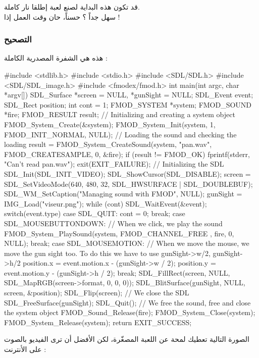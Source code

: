قد تكون هذه البداية لصنع لعبة إطلقا نار كاملة.\\
سهل جداً ؟ حسناً، حان وقت العمل إذا !

\subsubsection{التصحيح}

هذه هي الشفرة المصدرية الكاملة :

\begin{Csource}
#include <stdlib.h>
#include <stdio.h>
#include <SDL/SDL.h>
#include <SDL/SDL_image.h>
#include <fmodex/fmod.h>
int main(int argc, char *argv[])
{
	SDL_Surface *screen = NULL, *gunSight = NULL;
	SDL_Event event;
	SDL_Rect position;
	int cont = 1;
	FMOD_SYSTEM *system;
	FMOD_SOUND *fire;
	FMOD_RESULT result;
	// Initializing and creating a system object
	FMOD_System_Create(&system);
	FMOD_System_Init(system, 1, FMOD_INIT_NORMAL, NULL);
	// Loading the sound and checking the loading
	result = FMOD_System_CreateSound(system, "pan.wav", FMOD_CREATESAMPLE, 0, &fire);
	if (result != FMOD_OK)
	{
		fprintf(stderr, "Can't read pan.wav\n");
		exit(EXIT_FAILURE);
	}
	// Initializing the SDL
	SDL_Init(SDL_INIT_VIDEO);
	SDL_ShowCursor(SDL_DISABLE);
	screen = SDL_SetVideoMode(640, 480, 32, SDL_HWSURFACE | SDL_DOUBLEBUF);
	SDL_WM_SetCaption("Managing sound with FMOD", NULL);
	gunSight = IMG_Load("viseur.png");
	while (cont)
	{
		SDL_WaitEvent(&event);
		switch(event.type)
		{
			case SDL_QUIT:
			cont = 0;
			break;
			case SDL_MOUSEBUTTONDOWN:
			// When we click, we play the sound
			FMOD_System_PlaySound(system, FMOD_CHANNEL_FREE , fire, 0, NULL);
			break;
			case SDL_MOUSEMOTION:
			// When we move the mouse, we move the gun sight too. To do this we have to use gunSight->w/2, gunSight->h/2
			position.x = event.motion.x - (gunSight->w / 2);
			position.y = event.motion.y - (gunSight->h / 2);
			break;
		}
		SDL_FillRect(screen, NULL, SDL_MapRGB(screen->format, 0, 0, 0));
		SDL_BlitSurface(gunSight, NULL, screen, &position);
		SDL_Flip(screen);
	}	
	// We close the SDL
	SDL_FreeSurface(gunSight);
	SDL_Quit();
	// We free the sound, free and close the system object
	FMOD_Sound_Release(fire);
	FMOD_System_Close(system);
	FMOD_System_Release(system);
	return EXIT_SUCCESS;
}
\end{Csource}

الصورة التالية تعطيك لمحة عن اللعبة المصغّرة، لكن الأفضل أن ترى الفيديو بالصوت على الأنترنت :


